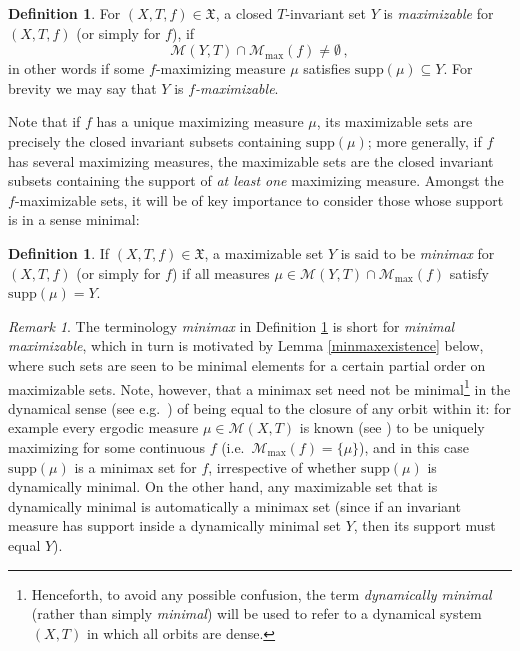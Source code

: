 \documentclass[reqno,11pt]{amsart}
\theoremstyle{definition}
\newtheorem{defn}[thm]{Definition}
\theoremstyle{remark}
\theoremstyle{remark}
\newtheorem{rem}[thm]{Remark}
\def\m{\mathcal M}
\def\X{\mathfrak{X}}
\numberwithin{equation}{section}
\begin{document}
\begin{defn}\label{maximizabledefn}
For $(X,T,f)\in\X$,
a closed $T$-invariant set $Y$ is
\emph{maximizable} for $(X,T,f)$ (or simply for $f$), 
if 
\begin{equation}\label{maximizableeqn}
\m(Y,T)\cap\m_{\max}(f)\neq\emptyset\,,
\end{equation}
in other words if
some $f$-maximizing measure 
$\mu$ satisfies $\text{supp}(\mu)\subseteq Y$. 
For brevity we may say that $Y$ is \emph{$f$-maximizable}.
\end{defn}


Note that if $f$ has a unique maximizing measure $\mu$, its maximizable sets are precisely the closed invariant subsets containing $\text{supp}(\mu)$;
more generally, if $f$ has several maximizing measures, the maximizable sets are the closed invariant subsets containing the support of \emph{at least one} maximizing measure.
Amongst the $f$-maximizable sets, it will be of key importance to consider those whose support is in a sense minimal:

\begin{defn}\label{minimaxdefn}
If $(X,T,f)\in\X$,
a maximizable set $Y$ is said to be
\emph{minimax} for $(X,T,f)$ (or simply for $f$) if all measures $\mu\in\m(Y,T)\cap \m_{\max}(f)$ satisfy $\text{supp}(\mu)=Y$.
\end{defn}

\begin{rem}\label{notdynamicallyminimal}
The terminology \emph{minimax} in Definition \ref{minimaxdefn} is short for
\emph{minimal maximizable}, which in turn is motivated by Lemma \ref{minmaxexistence} below,
where such sets are seen to be minimal elements for a certain partial order on maximizable sets.
Note, however, that a minimax set need not be minimal\footnote{Henceforth, to avoid any possible confusion,
the term \emph{dynamically minimal} (rather than simply \emph{minimal}) will be used to refer to a 
dynamical system $(X,T)$ in which all orbits are dense.}
 in the dynamical sense (see e.g.~\cite[Defn.~1.3.2]{KH95}) of being equal to the closure of any orbit within it: for example every ergodic measure $\mu\in\m(X,T)$ is known (see \cite{Jen06b})
to be uniquely maximizing for some continuous $f$ (i.e.~$\m_{\max}(f)=\{\mu\}$), and in this case $\text{supp}(\mu)$ is a minimax set for $f$, irrespective of whether  $\text{supp}(\mu)$ is dynamically minimal. 
On the other hand, any maximizable set that is dynamically minimal is automatically a minimax set (since if an
invariant measure has support inside a dynamically
minimal set $Y$, then its support must equal $Y$).
\end{rem}
\end{document}
